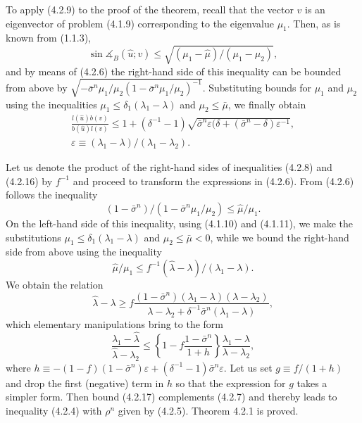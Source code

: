 \documentclass[11pt,oneside]{book}
\newcommand{\ang}{\measuredangle}
\begin{document}
To apply (4.2.9) to the proof of the theorem, recall that the vector $v$ is an eigenvector of problem (4.1.9) corresponding to the eigenvalue $\mu_1$. Then, as is known from (1.1.3),
\[
\sin \ang_B (\hat{u}; v) \leqslant \sqrt{ (\mu_1 - \hat{\mu}) / (\mu_1 - \mu_2) },
\]
and by means of (4.2.6) the right-hand side of this inequality can be bounded from above by $\sqrt{ - \bar{\sigma}^n \mu_1 / \mu_2 (1 - \bar{\sigma}^n \mu_1 / \mu_2)^{-1} }$. Substituting bounds for $\mu_1$ and $\mu_2$ using the inequalities $\mu_1 \leqslant \delta_1 (\lambda_1 - \lambda)$ and $\mu_2 \leqslant \bar{\mu}$, we finally obtain
\begin{gather*}
\frac{l(\hat{u}) b(v)}{b(\hat{u}) l(v)} \leqslant 1 + (\delta^{-1} - 1) \sqrt{ \bar{\sigma}^n \varepsilon (\delta + (\bar{\sigma}^n - \delta) \varepsilon^{-1} }, \tag{4.2.16} \\ %
\varepsilon \equiv (\lambda_1 - \lambda) / (\lambda_1 - \lambda_2).
\end{gather*}

Let us denote the product of the right-hand sides of inequalities (4.2.8) and (4.2.16) by $f^{-1}$ and proceed to transform the expressions in (4.2.6). From (4.2.6) follows the inequality
\[
(1 - \bar{\sigma}^n) / (1 - \bar{\sigma}^n \mu_1 / \mu_2) \leqslant \hat{\mu} / \mu_1.
\]
On the left-hand side of this inequality, using (4.1.10) and (4.1.11), we make the substitutions $\mu_1 \leqslant \delta_1 (\lambda_1 - \lambda)$ and $\mu_2 \leqslant \bar{\mu} < 0$, while we bound the right-hand side from above
using the inequality
\[
\hat{\mu} / \mu_1 \leqslant f^{-1} (\hat{\lambda} - \lambda) / (\lambda_1 - \lambda).
\]
We obtain the relation
\[
\hat{\lambda} - \lambda \geqslant f \frac{(1 - \bar{\sigma}^n)(\lambda_1 - \lambda)(\lambda - \lambda_2)}{\lambda - \lambda_2 + \delta^{-1} \bar{\sigma}^n (\lambda_1 - \lambda)},
\]
which elementary manipulations bring to the form
\[
\frac{\lambda_1 - \hat{\lambda}}{\hat{\lambda} - \lambda_2} \leqslant \left\{ 1 - f \frac{1 - \bar{\sigma}^n}{1 + h} \right\} \frac{\lambda_1 - \lambda}{\lambda - \lambda_2}, \tag{4.2.17}
\]
where $h \equiv - (1 - f)(1 - \bar{\sigma}^n)\varepsilon + (\delta^{-1} - 1)\bar{\sigma}^n \varepsilon$. Let us set $g \equiv f / (1 + h)$ and drop the first (negative) term in $h$ so that the expression for $g$ takes a simpler form. Then bound (4.2.17) complements (4.2.7) and thereby leads to inequality (4.2.4) with $\rho^n$ given by (4.2.5). Theorem 4.2.1 is proved. %
\end{document}

